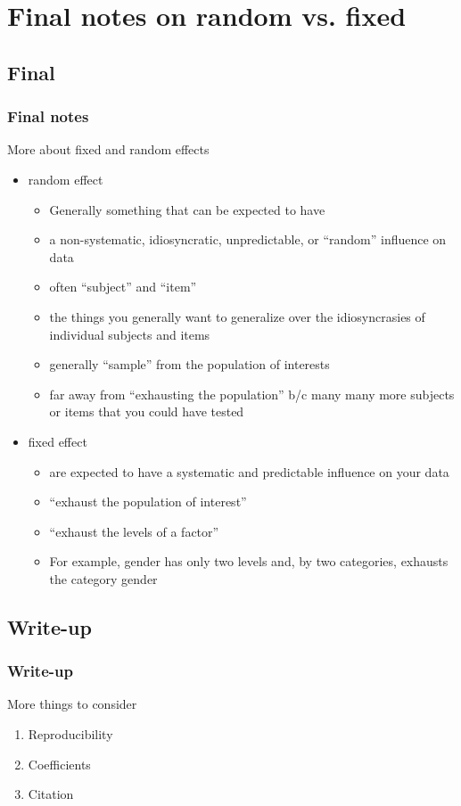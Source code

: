 \documentclass[10p]{beamer}\usepackage[]{graphicx}\usepackage[]{color}
\begin{document}
\section[Final]{Final notes on random vs. fixed}
\subsection{Final}
\begin{frame}
\frametitle{Final notes}
More about fixed and random effects
\begin{itemize}
\item random effect
  \begin{itemize}
  \item Generally something that can be expected to have 
  \item a non-systematic, idiosyncratic, unpredictable, or ``random'' influence on data
  \item often ``subject'' and ``item''
  \item the things you generally want to generalize over the idiosyncrasies of individual subjects and items
  \item generally ``sample'' from the population of interests
  \item far away from ``exhausting the population'' b/c many many more subjects or items that you could have tested
  \end{itemize}
  
\item fixed effect
  \begin{itemize}
  \item are expected to have a systematic and predictable influence on your data
  \item ``exhaust the population of interest''
  \item ``exhaust the levels of a factor''
  \item For example, gender has only two levels and, by two categories, exhausts the category gender
  \end{itemize}
\end{itemize}
\end{frame}

\subsection{Write-up}
\begin{frame}[fragile]
\frametitle{Write-up}
More things to consider
\begin{enumerate}
\item Reproducibility
\item Coefficients
\item Citation
\end{enumerate}
\end{frame}
\end{document}
